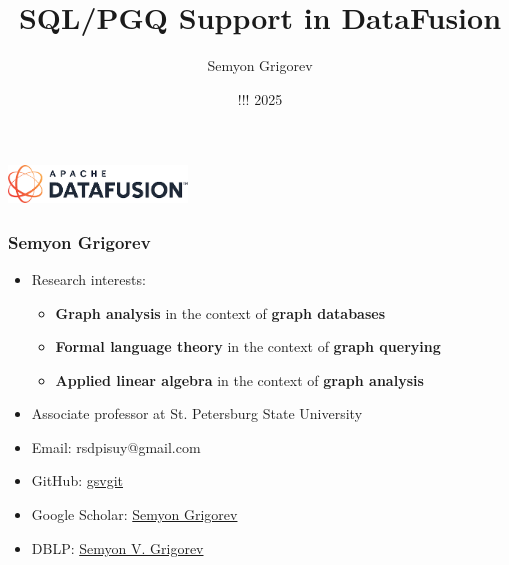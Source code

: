 \documentclass[xcolor=table,aspectratio=169]{beamer}
\title[SQL/PGQ for DataFusion]{SQL/PGQ Support in DataFusion}
\institute[SPbSU]{St. Petersburg State University}
\author[Semyon Grigorev]{Semyon Grigorev}
\date{!!! 2025}
\begin{document}
{
\begin{frame}[fragile]
  \begin{table}
  \centering
  \includegraphics[height=1cm]{pictures/Untitled.png}
  \vfill
  \end{table}
  \vfill
  \titlepage
\end{frame}
}

\begin{frame}[fragile]
  \frametitle{Semyon Grigorev}
  \begin{minipage}{0.74\textwidth}
  \begin{itemize}    
    \item Research interests:
    \begin{itemize}    
      \item \textbf{Graph analysis} in the context of \textbf{graph databases}
      \item \textbf{Formal language theory} in the context of \textbf{graph querying}
      \item \textbf{Applied linear algebra} in the context of \textbf{graph analysis}
    \end{itemize}
    \item Associate professor at St. Petersburg State University
    \item Email: rsdpisuy@gmail.com 
    \item GitHub: \href{https://github.com/gsvgit}{gsvgit}
    \item Google Scholar: \href{https://scholar.google.com/citations?hl=ru&user=kP4dqUAAAAAJ&view_op=list_works&sortby=pubdate}{Semyon Grigorev}
    \item DBLP: \href{https://dblp.org/pid/181/9903.html}{Semyon V. Grigorev}
  \end{itemize}
\end{minipage}
\begin{minipage}[t]{0.24\textwidth}
  \begin{center}

\end{center}
\end{minipage}
\end{frame}
\end{document}
